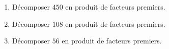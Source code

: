 \begin{minipage}{0.99\linewidth}
\exo
\begin{enumerate}

\item Décomposer $450$ en produit de facteurs premiers.
\item Décomposer $108$ en produit de facteurs premiers.
\item Décomposer $56$ en produit de facteurs premiers.

\end{enumerate}

\end{minipage}

\vspace{0.5cm}
